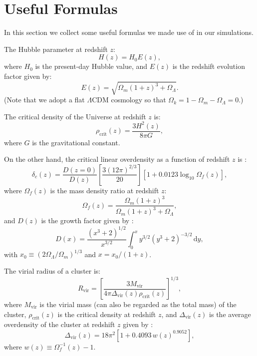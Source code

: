 \documentclass[modern]{aastex61}
\newcommand{\R}[1]{\mathrm{#1}}
\newcommand{\D}[1]{\R{d} #1}
\newcommand{\lcdm}{$\Lambda$CDM}
\begin{document}
\section{Useful Formulas}
\label{sec:formulas}

In this section we collect some useful formulas we made use of in our
simulations.

The Hubble parameter at redshift $z$:
\begin{equation}
  \label{eq:hubble-z}
  H(z) = H_0 E(z),
\end{equation}
where $H_0$ is the present-day Hubble value,
and $E(z)$ is the redshift evolution factor given by:
\begin{equation}
  \label{eq:ez-func}
  E(z) = \sqrt{\Omega_m(1+z)^3 + \Omega_{\Lambda}}.
\end{equation}
(Note that we adopt a flat \lcdm{} cosmology so that
$\Omega_k = 1 - \Omega_m - \Omega_{\Lambda} = 0$.)

The critical density of the Universe at redshift $z$ is:
\begin{equation}
  \label{eq:rho-crit}
  \rho_{\R{crit}}(z) = \frac{3 H^2(z)}{8 \pi G},
\end{equation}
where $G$ is the gravitational constant.

On the other hand, the critical linear overdensity as a function of
redshift $z$ is \citep{kitayama1996,randall2002}:
\begin{equation}
  \label{eq:delta-crit}
  \delta_c(z) = \frac{D(z=0)}{D(z)}
  \left[ \frac{3 (12\pi)^{2/3}}{20} \right]
  \left[1 + 0.0123 \log_{10} \Omega_f(z) \right],
\end{equation}
where $\Omega_f(z)$ is the mass density ratio at redshift $z$:
\begin{equation}
  \label{eq:omega-fz}
  \Omega_f(z) = \frac{\Omega_m(1+z)^3}{\Omega_m(1+z)^3 + \Omega_{\Lambda}},
\end{equation}
and $D(z)$ is the growth factor given by
\citep[Equation~(13.6)]{peebles1980}:
\begin{equation}
  \label{eq:growth-factor}
  D(x) = \frac{(x^3 + 2)^{1/2}}{x^{3/2}}
    \int_0^x y^{3/2} (y^3 + 2)^{-3/2} \,\D{y},
\end{equation}
with $x_0 \equiv (2\Omega_{\Lambda}/\Omega_m)^{1/3}$ and
$x = x_0 / (1+z)$.

The virial radius of a cluster is:
\begin{equation}
  \label{eq:radius-virial}
  R_{\R{vir}} = \left[
    \frac{3 M_{\R{vir}}}{4\pi \Delta_{\R{vir}}(z) \rho_{\R{crit}}(z)}
  \right]^{1/3},
\end{equation}
where $M_{\R{vir}}$ is the virial mass (can also be regarded as
the total mass) of the cluster,
$\rho_{\R{crit}}(z)$ is the critical density at redshift $z$,
and $\Delta_{\R{vir}}(z)$ is the average overdensity of the cluster
at redshift $z$ given by \citep{kitayama1996,cassano2005}:
\begin{equation}
  \label{eq:delta-vir}
  \Delta_{\R{vir}}(z) = 18\pi^2 \left[ 1 + 0.4093 \, w(z)^{0.9052} \right],
\end{equation}
where $w(z) \equiv \Omega_f^{-1}(z) - 1$.
\end{document}
